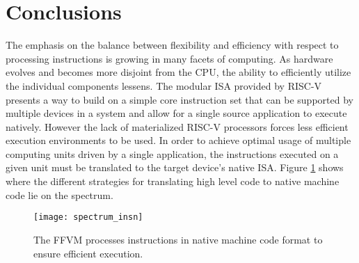 \section{Conclusions}
\label{insn:concl}
The emphasis on the balance between flexibility and efficiency with respect to
processing instructions is growing in many facets of computing. As hardware
evolves and becomes more disjoint from the CPU, the ability to efficiently
utilize the individual components lessens. The modular ISA provided by RISC-V
presents a way to build on a simple core instruction set that can be supported
by multiple devices in a system and allow for a single source application to
execute natively. However the lack of materialized RISC-V processors forces
less efficient execution environments to be used. In order to achieve optimal
usage of multiple computing units driven by a single application, the
instructions executed on a given unit must be translated to the target device's
native ISA. Figure \ref{spectrum_insn} shows where the different strategies for
translating high level code to native machine code lie on the spectrum.

\begin{figure}[h!]
  \centering
  \texttt{[image: spectrum\_insn]}
  \caption{The FFVM processes instructions in native machine code format to
  ensure efficient execution.}
  \label{spectrum_insn}
\end{figure}
